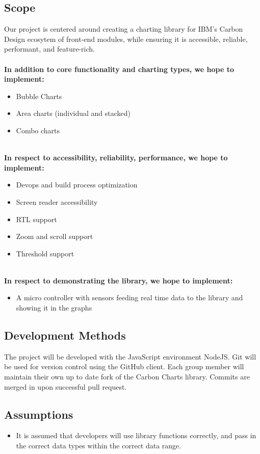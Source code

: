 \documentclass[12pt, titlepage]{article}
\begin{document}
\subsection{Scope}
Our project is centered around creating a charting library for IBM's Carbon Design ecosytem of front-end modules, while ensuring it is accessible, reliable, performant, and feature-rich. \\
\\
\textbf{In addition to core functionality and charting types, we hope to implement:}
\begin{itemize}
    \item Bubble Charts
    \item Area charts (individual and stacked)
    \item Combo charts
\end{itemize}
\\
\textbf{In respect to accessibility, reliability, performance, we hope to implement:}
\begin{itemize}
    \item Devops and build process optimization
    \item Screen reader accessibility
    \item RTL support
    \item Zoom and scroll support
    \item Threshold support
\end{itemize}
\\
\textbf{In respect to demonstrating the library, we hope to implement:}
\begin{itemize}
    \item A micro controller with sensors feeding real time data to the library and showing it in the graphs
\end{itemize}

\subsection{Development Methods}

The project will be developed with the JavaScript environment NodeJS. Git will be used for version control using the GitHub client. Each group member will maintain their own up to date fork of the Carbon Charts library. Commits are merged in upon successful pull request.

\subsection{Assumptions}
\begin{itemize}
    \item It is assumed that developers will use library functions correctly, and pass in the correct data types within the correct data range.
\end{itemize}
\end{document}

